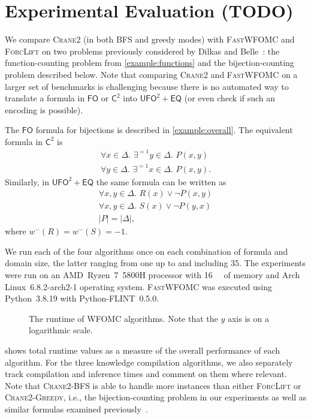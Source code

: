 \documentclass{article}
\theoremstyle{definition}
\newcommand{\Ctwo}{$\mathsf{C}^{2}$}
\newcommand{\FO}{$\mathsf{FO}$}
\newcommand{\UFO}{$\mathsf{UFO}^{2} + \mathsf{EQ}$}
\newcommand{\Cranetwo}{\textsc{Crane2}}
\newcommand{\Cranebfs}{\textsc{Crane2-BFS}}
\newcommand{\Cranegreedy}{\textsc{Crane2-Greedy}}
\begin{document}
\section{Experimental Evaluation (TODO)}

We compare \Cranetwo{} (in both BFS and greedy modes) with \textsc{FastWFOMC}
and \textsc{ForcLift} on two problems previously considered by Dilkas and
Belle~: the function-counting problem from
\cref{example:functions} and the bijection-counting problem described below.
Note that comparing \Cranetwo{} and \textsc{FastWFOMC} on a larger set of
benchmarks is challenging because there is no automated way to translate a
formula in \FO{} or \Ctwo{} into \UFO{} (or even check if such an encoding is
possible).

The \FO{} formula for bijections is described in \cref{example:overall}. The
equivalent formula in \Ctwo{} is
\begin{gather*}
  \forall x \in \Delta\text{. }\exists^{=1} y \in \Delta\text{. }P(x, y)\\
  \forall y \in \Delta\text{. }\exists^{=1} x \in \Delta\text{. }P(x, y).
\end{gather*}
Similarly, in \UFO{} the same formula can be written as
\begin{gather*}
  \forall x, y \in \Delta\text{. }R(x) \lor \neg P(x, y)\\
  \forall x, y \in \Delta\text{. }S(x) \lor \neg P(y, x)\\
  |P| = |\Delta|,
\end{gather*}
where $w^{-}(R) = w^{-}(S) = -1$.

We run each of the four algorithms once on each combination of formula and
domain size, the latter ranging from one up to and including 35. The experiments
were run on an AMD~Ryzen~7~5800H processor with \SI{16}{\gibi\byte} of memory
and Arch Linux~6.8.2-arch2-1 operating system. \textsc{FastWFOMC} was executed
using Python~3.8.19 with Python-FLINT~0.5.0.

\begin{figure}
  \centering
  
  \caption{The runtime of WFOMC algorithms. Note that the $y$ axis is on a
    logarithmic scale.}\label{fig:plot}
\end{figure}

 shows total runtime values as a measure of the overall
performance of each algorithm. For the three knowledge compilation algorithms,
we also separately track compilation and inference times and comment on them
where relevant. Note that \Cranebfs{} is able to handle more instances than
either \textsc{ForcLift} or \Cranegreedy{}, i.e., the bijection-counting problem
in our experiments as well as similar formulas examined
previously~\cite{DBLP:conf/kr/DilkasB23}.
\end{document}
